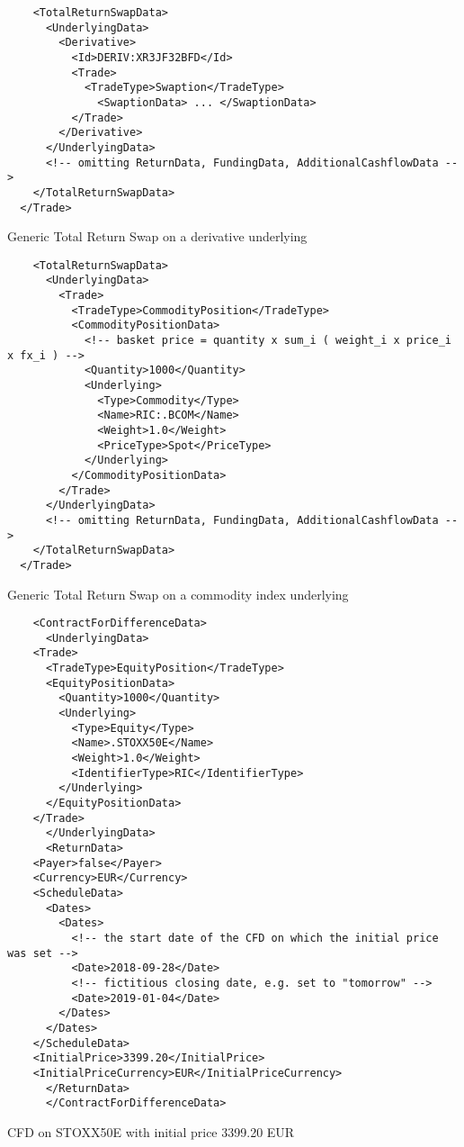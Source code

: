 \begin{listing}[H]
\begin{verbatim}
    <TotalReturnSwapData>
      <UnderlyingData>
        <Derivative>
          <Id>DERIV:XR3JF32BFD</Id>
          <Trade>
            <TradeType>Swaption</TradeType>
              <SwaptionData> ... </SwaptionData>
          </Trade>
        </Derivative>
      </UnderlyingData>
      <!-- omitting ReturnData, FundingData, AdditionalCashflowData -->
    </TotalReturnSwapData>
  </Trade>
\end{verbatim}
\caption{Generic Total Return Swap on a derivative underlying}
\label{lst:trsdata4}
\end{listing}

\begin{listing}[H]
\begin{verbatim}
    <TotalReturnSwapData>
      <UnderlyingData>
        <Trade>
          <TradeType>CommodityPosition</TradeType>
          <CommodityPositionData>
            <!-- basket price = quantity x sum_i ( weight_i x price_i x fx_i ) -->
            <Quantity>1000</Quantity>
            <Underlying>
              <Type>Commodity</Type>
              <Name>RIC:.BCOM</Name>
              <Weight>1.0</Weight>
              <PriceType>Spot</PriceType>
            </Underlying>
          </CommodityPositionData>
        </Trade>
      </UnderlyingData>
      <!-- omitting ReturnData, FundingData, AdditionalCashflowData -->
    </TotalReturnSwapData>
  </Trade>
\end{verbatim}
\caption{Generic Total Return Swap on a commodity index underlying}
\label{lst:trsdata5}
\end{listing}

\begin{listing}[H]
\begin{verbatim}
    <ContractForDifferenceData>
      <UnderlyingData>
	<Trade>
	  <TradeType>EquityPosition</TradeType>
	  <EquityPositionData>
	    <Quantity>1000</Quantity>
	    <Underlying>
	      <Type>Equity</Type>
	      <Name>.STOXX50E</Name>
	      <Weight>1.0</Weight>
	      <IdentifierType>RIC</IdentifierType>
	    </Underlying>
	  </EquityPositionData>
	</Trade>
      </UnderlyingData>
      <ReturnData>
	<Payer>false</Payer>
	<Currency>EUR</Currency>
	<ScheduleData>
	  <Dates>
	    <Dates>
	      <!-- the start date of the CFD on which the initial price was set -->
	      <Date>2018-09-28</Date>
	      <!-- fictitious closing date, e.g. set to "tomorrow" -->
	      <Date>2019-01-04</Date>
	    </Dates>
	  </Dates>
	</ScheduleData>
	<InitialPrice>3399.20</InitialPrice>
	<InitialPriceCurrency>EUR</InitialPriceCurrency>
      </ReturnData>
      </ContractForDifferenceData>
\end{verbatim}
\caption{CFD on STOXX50E with initial price 3399.20 EUR}
\label{lst:trsdata_cfd}
\end{listing}
